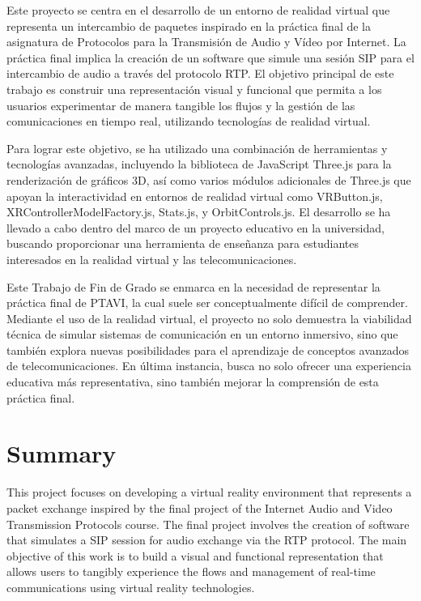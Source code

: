 \documentclass[a4paper, 12pt]{book}
\begin{document}
Este proyecto se centra en el desarrollo de un entorno de realidad virtual que representa un intercambio de paquetes inspirado en la 
práctica final de la asignatura de Protocolos para la Transmisión de Audio y Vídeo por Internet. La práctica final implica la creación 
de un software que simule una sesión SIP para el intercambio de audio a través del protocolo RTP. El objetivo principal de este trabajo es construir 
una representación visual y funcional que permita a los usuarios experimentar de manera tangible los flujos y la gestión de las comunicaciones 
en tiempo real, utilizando tecnologías de realidad virtual.

\bigskip

Para lograr este objetivo, se ha utilizado una combinación de herramientas y tecnologías avanzadas, incluyendo la biblioteca de 
JavaScript Three.js para la renderización de gráficos 3D, así como varios módulos adicionales de Three.js que apoyan la interactividad en 
entornos de realidad virtual como VRButton.js, XRControllerModelFactory.js, Stats.js, y OrbitControls.js. El desarrollo se ha llevado a cabo dentro del marco 
de un proyecto educativo en la universidad, buscando proporcionar una herramienta de enseñanza para 
estudiantes interesados en la realidad virtual y las telecomunicaciones.

\bigskip

Este Trabajo de Fin de Grado se enmarca en la necesidad de representar la práctica final de PTAVI, la cual suele ser conceptualmente difícil de 
comprender. Mediante el uso de la realidad virtual, el proyecto no solo demuestra la viabilidad técnica de simular sistemas de comunicación 
en un entorno inmersivo, sino que también explora nuevas posibilidades para el aprendizaje de conceptos avanzados de telecomunicaciones. 
En última instancia, busca no solo ofrecer una experiencia educativa más representativa, sino también mejorar la comprensión de esta práctica final.



\chapter*{Summary}

This project focuses on developing a virtual reality environment that represents a packet exchange inspired by the final project of the Internet Audio and 
Video Transmission Protocols course. The final project involves the creation of software that simulates a SIP session for audio exchange via the RTP protocol. 
The main objective of this work is to build a visual and functional representation that allows users to tangibly experience the flows and management 
of real-time communications using virtual reality technologies.
\end{document}
